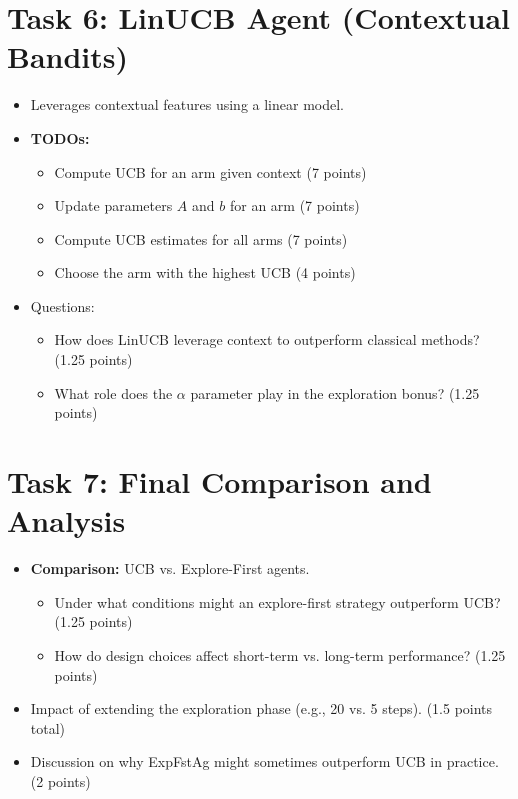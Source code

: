 \documentclass[12pt]{article}
\begin{document}
{{{\section{Task 6: LinUCB Agent (Contextual Bandits)}
\begin{itemize}[noitemsep]
    \item Leverages contextual features using a linear model.
    \item \textbf{TODOs:}
    \begin{itemize}[noitemsep]
        \item Compute UCB for an arm given context (7 points)
        \item Update parameters \(A\) and \(b\) for an arm (7 points)
        \item Compute UCB estimates for all arms (7 points)
        \item Choose the arm with the highest UCB (4 points)
    \end{itemize}
    \item Questions:
    \begin{itemize}[noitemsep]
        \item How does LinUCB leverage context to outperform classical methods? (1.25 points)
        \item What role does the \(\alpha\) parameter play in the exploration bonus? (1.25 points)
    \end{itemize}
\end{itemize}

\section{Task 7: Final Comparison and Analysis}
\begin{itemize}[noitemsep]
    \item \textbf{Comparison:} UCB vs. Explore-First agents.
    \begin{itemize}[noitemsep]
        \item Under what conditions might an explore-first strategy outperform UCB? (1.25 points)
        \item How do design choices affect short-term vs. long-term performance? (1.25 points)
    \end{itemize}
    \item Impact of extending the exploration phase (e.g., 20 vs. 5 steps). (1.5 points total)
    \item Discussion on why ExpFstAg might sometimes outperform UCB in practice. (2 points)
\end{itemize}

}}}
\end{document}

